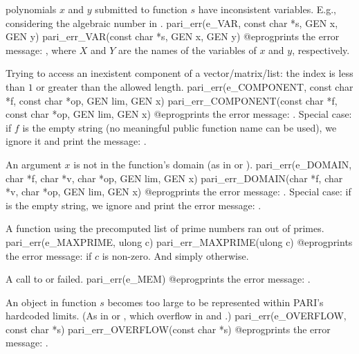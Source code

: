  polynomials $x$ and $y$ submitted to function $s$ have
inconsistent variables. E.g., considering the algebraic number
 in .
\bprog
  pari_err(e_VAR, const char *s, GEN x, GEN y)
  pari_err_VAR(const char *s, GEN x, GEN y)
@eprog\noindent prints the error message: , where $X$ and $Y$ are the names of the variables of $x$ and $y$,
respectively.


 Trying to access an inexistent component of a
vector/matrix/list: the index is less than $1$ or greater
than the allowed length.
\bprog
  pari_err(e_COMPONENT, const char *f, const char *op, GEN lim, GEN x)
  pari_err_COMPONENT(const char *f, const char *op, GEN lim, GEN x)
@eprog\noindent prints the error message: . Special case: if $f$ is the empty string (no
meaningful public function name can be used), we ignore it and print the
message: .

 An argument $x$ is not in the function's domain (as in
 or ).
\bprog
  pari_err(e_DOMAIN, char *f, char *v, char *op, GEN lim, GEN x)
  pari_err_DOMAIN(char *f, char *v, char *op, GEN lim, GEN x)
@eprog\noindent prints the error message: . Special case: if  is the empty string, we ignore
 and print the error message: .

 A function using the precomputed list of prime numbers
ran out of primes.
\bprog
  pari_err(e_MAXPRIME, ulong c)
  pari_err_MAXPRIME(ulong c)
@eprog\noindent prints the error message:  if $c$ is non-zero. And simply  otherwise.

 A call to  or  failed.
\bprog
  pari_err(e_MEM)
@eprog\noindent prints the error message: .

 An object in function $s$ becomes too large to be
represented within PARI's hardcoded limits. (As in 
or , which overflow in  and .)
\bprog
  pari_err(e_OVERFLOW, const char *s)
  pari_err_OVERFLOW(const char *s)
@eprog\noindent prints the error message: .

